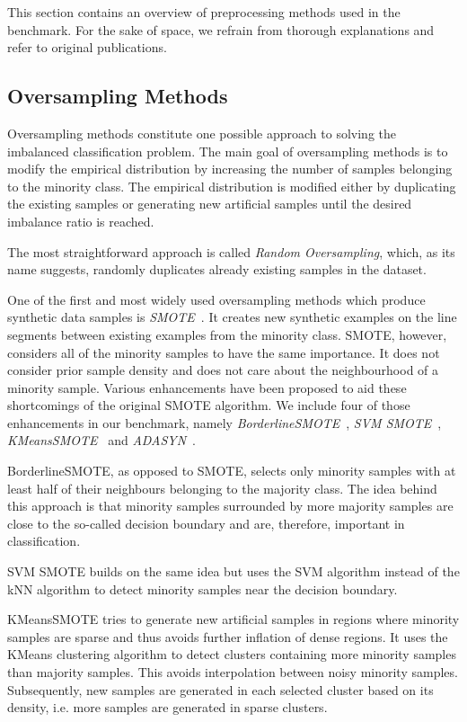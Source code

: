 \documentclass[conference]{IEEEtran}
\begin{document}
This section contains an overview of preprocessing methods used in the benchmark. For the sake of
space, we refrain from thorough explanations and refer to original publications.


\subsection{Oversampling Methods}

Oversampling methods constitute one possible approach to solving the imbalanced classification
problem. The main goal of oversampling methods is to modify the empirical distribution by
increasing the number of samples belonging to the minority class. The empirical distribution is
modified either by duplicating the existing samples or generating new artificial samples until the
desired imbalance ratio is reached.

The most straightforward approach is called \emph{Random Oversampling}, which, as its name
suggests, randomly duplicates already existing samples in the dataset.

One of the first and most widely used oversampling methods which produce synthetic data samples is
\emph{SMOTE}~\cite{smote}. It creates new synthetic examples on the line segments between existing
examples from the minority class. SMOTE, however, considers all of the minority samples to have the
same importance. It does not consider prior sample density and does not care about the
neighbourhood of a minority sample. Various enhancements have been proposed to aid these
shortcomings of the original SMOTE algorithm. We include four of those enhancements in our
benchmark, namely \emph{BorderlineSMOTE}~\cite{borderline-smote}, \emph{SVM
SMOTE}~\cite{svm-smote}, \emph{KMeansSMOTE}~\cite{kmeans-smote} and \emph{ADASYN}~\cite{adasyn}.

BorderlineSMOTE, as opposed to SMOTE, selects only minority samples with at least half of their
neighbours belonging to the majority class. The idea behind this approach is that minority samples
surrounded by more majority samples are close to the so-called decision boundary and are,
therefore, important in classification.

SVM SMOTE builds on the same idea but uses the SVM algorithm instead of the kNN algorithm to detect
minority samples near the decision boundary.

KMeansSMOTE tries to generate new artificial samples in regions where minority samples are sparse
and thus avoids further inflation of dense regions. It uses the KMeans clustering algorithm to
detect clusters containing more minority samples than majority samples. This avoids interpolation
between noisy minority samples. Subsequently, new samples are generated in each selected cluster
based on its density, i.e. more samples are generated in sparse clusters.
\end{document}
